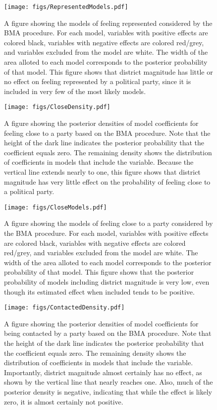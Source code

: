 \documentclass[12pt]{article}
\begin{document}
\newpage
\begin{figure}[h]
\centering
\texttt{[image: figs/RepresentedModels.pdf]}
\caption{A figure showing the models of feeling represented considered by the BMA procedure. For each model, variables with positive effects are colored black, variables with negative effects are colored red/grey, and variables excluded from the model are white. The width of the area alloted to each model corresponds to the posterior probability of that model. This figure shows that district magnitude has little or no effect on feeling represented by a political party, since it is included in very few of the most likely models.}\label{fig:RepresentedModels}
\end{figure}

%

\newpage
\begin{figure}[h]
\centering
\texttt{[image: figs/CloseDensity.pdf]}
\caption{A figure showing the posterior densities of model coefficients for feeling close to a party based on the BMA procedure. Note that the height of the dark line indicates the posterior probability that the coefficient equals zero. The remaining density shows the distribution of coefficients in models that include the variable. Because the vertical line extends nearly to one, this figure shows that district magnitude has very little effect on the probability of feeling close to a political party.}\label{fig:CloseDensity}
\end{figure}

\newpage
\begin{figure}[h]
\centering
\texttt{[image: figs/CloseModels.pdf]}
\caption{A figure showing the models of feeling close to a party considered by the BMA procedure. For each model, variables with positive effects are colored black, variables with negative effects are colored red/grey, and variables excluded from the model are white. The width of the area alloted to each model corresponds to the posterior probability of that model. This figure shows that the posterior probability of models including district magnitude is very low, even though its estimated effect when included tends to be positive.}\label{fig:CloseModels}
\end{figure}

%

%
\newpage
\begin{figure}[h]
\centering
\texttt{[image: figs/ContactedDensity.pdf]}
\caption{A figure showing the posterior densities of model coefficients for being contacted by a party based on the BMA procedure. Note that the height of the dark line indicates the posterior probability that the coefficient equals zero. The remaining density shows the distribution of coefficients in models that include the variable. Importantly, district magnitude almost certainly has no effect, as shown by the vertical line that nearly reaches one. Also, much of the posterior density is negative, indicating that while the effect is likely zero, it is almost certainly not positive.}\label{fig:ContactedDensity}
\end{figure}
\end{document}
